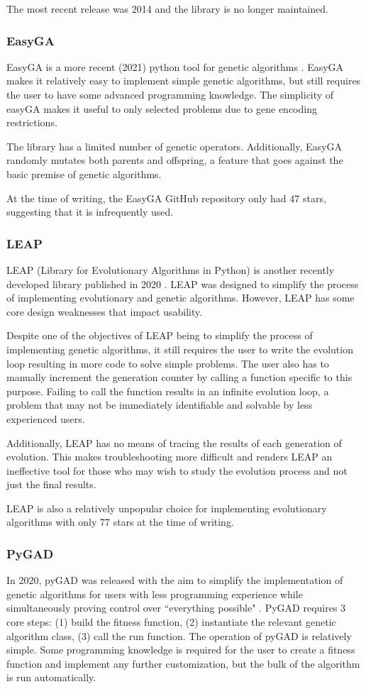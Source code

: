 \documentclass[12pt]{report}
\begin{document}
The most recent release was 2014 and the library is no longer maintained.

\subsubsection{EasyGA}
EasyGA is a more recent (2021) python tool for genetic algorithms \cite{easyGA}. EasyGA makes it relatively easy to implement simple genetic algorithms, but still requires the user to have some advanced programming knowledge. The simplicity of easyGA makes it useful to only selected problems due to gene encoding restrictions.

The library has a limited number of genetic operators. Additionally, EasyGA randomly mutates both parents and offspring, a feature that goes against the basic premise of genetic algorithms. 

At the time of writing, the EasyGA GitHub repository only had 47 stars, suggesting that it is infrequently used.

\subsubsection{LEAP}
LEAP (Library for Evolutionary Algorithms in Python) is another recently developed library published in 2020 \cite{LEAP}. LEAP was designed to simplify the process of implementing evolutionary and genetic algorithms. However, LEAP has some core design weaknesses that impact usability. 

Despite one of the objectives of LEAP being to simplify the process of implementing genetic algorithms, it still requires the user to write the evolution loop resulting in more code to solve simple problems. The user also has to manually increment the generation counter by calling a function specific to this purpose. Failing to call the function results in an infinite evolution loop, a problem that may not be immediately identifiable and solvable by less experienced users.

Additionally, LEAP has no means of tracing the results of each generation of evolution. This makes troubleshooting more difficult and renders LEAP an ineffective tool for those who may wish to study the evolution process and not just the final results.

LEAP is also a relatively unpopular choice for implementing evolutionary algorithms with only 77 stars at the time of writing.

\subsubsection{PyGAD}
In 2020, pyGAD was released with the aim to simplify the implementation of genetic algorithms for users with less programming experience while simultaneously proving control over ``everything possible" \cite{gad2023pygad}. PyGAD requires 3 core steps: (1) build the fitness function, (2) instantiate the relevant genetic algorithm class, (3) call the run function. The operation of pyGAD is relatively simple. Some programming knowledge is required for the user to create a fitness function and implement any further customization, but the bulk of the algorithm is run automatically. 
\end{document}
